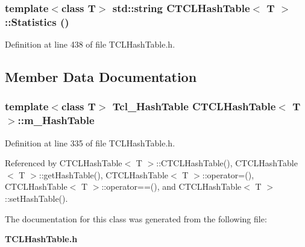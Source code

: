 \subsubsection{\setlength{\rightskip}{0pt plus 5cm}template$<$class T$>$ std::string CTCLHash\-Table$<$ T $>$::Statistics ()\hspace{0.3cm}{\tt  [inline]}}\label{classCTCLHashTable_a12}




Definition at line 438 of file TCLHash\-Table.h.

\subsection{Member Data Documentation}
\subsubsection{\setlength{\rightskip}{0pt plus 5cm}template$<$class T$>$ Tcl\_\-Hash\-Table CTCLHash\-Table$<$ T $>$::m\_\-Hash\-Table\hspace{0.3cm}{\tt  [private]}}\label{classCTCLHashTable_o0}




Definition at line 335 of file TCLHash\-Table.h.

Referenced by CTCLHash\-Table$<$ T $>$::CTCLHash\-Table(), CTCLHash\-Table$<$ T $>$::get\-Hash\-Table(), CTCLHash\-Table$<$ T $>$::operator=(), CTCLHash\-Table$<$ T $>$::operator==(), and CTCLHash\-Table$<$ T $>$::set\-Hash\-Table().

The documentation for this class was generated from the following file:\begin{CompactItemize}
\item 
{\bf TCLHash\-Table.h}\end{CompactItemize}
